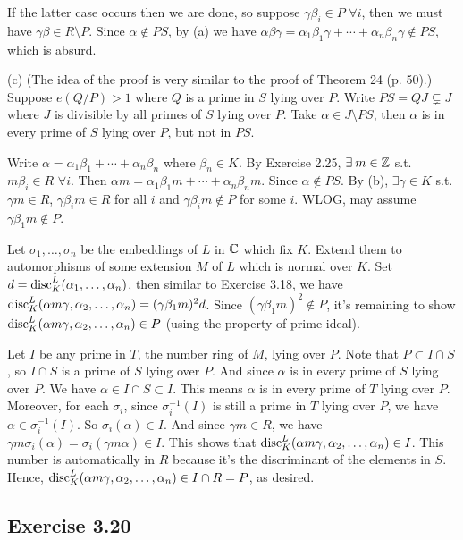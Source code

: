 \documentclass[../Marcus.tex]{subfiles}
\begin{document}
If the latter case occurs then we are done, so suppose $\gamma\beta_i\in P$ $\forall i$, then we must have $\gamma\beta\in R\setminus P$. Since $\alpha\notin PS$, by (a) we have $\alpha\beta\gamma=\alpha_1\beta_1\gamma+\cdots+\alpha_n\beta_n\gamma\notin PS$, which is absurd.

(c) (The idea of the proof is very similar to the proof of Theorem 24 (p. 50).) Suppose $e(Q/P)>1$ where $Q$ is a prime in $S$ lying over $P$. Write $PS=QJ\varsubsetneq J$ where $J$ is divisible by all primes of $S$ lying over $P$. Take $\alpha\in J\setminus PS$, then $\alpha$ is in every prime of $S$ lying over $P$, but not in $PS$.

Write $\alpha=\alpha_1\beta_1+\cdots+\alpha_n\beta_n$ where $\beta_n\in K$. By Exercise 2.25, $\exists m\in\ZZ$ s.t. $m\beta_i\in R$ $\forall i$. Then $\alpha m=\alpha_1\beta_1m+\cdots+\alpha_n\beta_nm$. Since $\alpha\notin PS$. By (b), $\exists\gamma\in K$ s.t. $\gamma m\in R$, $\gamma\beta_im\in R$ for all $i$ and $\gamma\beta_i m\notin P$ for some $i$. WLOG, may assume $\gamma\beta_1m\notin P$.

Let $\sigma_1,\ldots,\sigma_n$ be the embeddings of $L$ in $\mathbb{C}$ which fix $K$. Extend them to automorphisms of some extension $M$ of $L$ which is normal over $K$. Set $d=\operatorname{disc}^L_K(\alpha_1,\ldots,\alpha_n)$, then similar to Exercise 3.18, we have $\operatorname{disc}^L_K(\alpha m\gamma,\alpha_2,\ldots,\alpha_n)=(\gamma\beta_1 m)^2d$. Since $(\gamma\beta_1m)^2\notin P$, it's remaining to show $\operatorname{disc}^L_K(\alpha m\gamma,\alpha_2,\ldots,\alpha_n)\in P$ (using the property of prime ideal). 

Let $I$ be any prime in $T$, the number ring of $M$, lying over $P$. Note that $P\subset I\cap S$, so $I\cap S$ is a prime of $S$ lying over $P$. And since $\alpha$ is in every prime of $S$ lying over $P$. We have $\alpha\in I\cap S\subset I$. This means $\alpha$ is in every prime of $T$ lying over $P$. Moreover, for each $\sigma_i$, since $\sigma_i^{-1}(I)$ is still a prime in $T$ lying over $P$, we have $\alpha\in \sigma_i^{-1}(I)$. So $\sigma_i(\alpha)\in I$. And since $\gamma m\in R$, we have $\gamma m\sigma_i(\alpha)=\sigma_i(\gamma m\alpha)\in I$. This shows that $\operatorname{disc}^L_K(\alpha m\gamma,\alpha_2,\ldots,\alpha_n)\in I$. This number is automatically in $R$ because it's the discriminant of the elements in $S$. Hence, $\operatorname{disc}^L_K(\alpha m\gamma,\alpha_2,\ldots,\alpha_n)\in I\cap R=P$, as desired.

\subsection*{Exercise 3.20}
\end{document}
